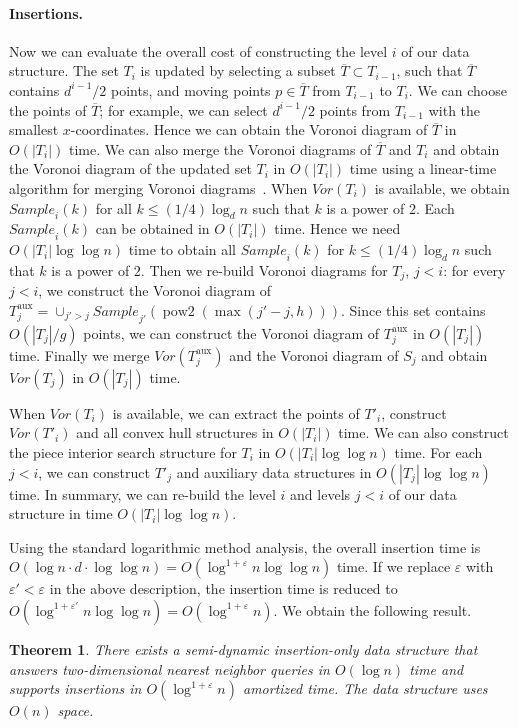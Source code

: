 \documentclass[12pt,a4paper,USenglish,cleveref, autoref, thm-restate]{article}
\newcommand{\Sample}{\mathit{Sample}}
\newcommand{\oT}{\overline{T}}
\newcommand{\Voron}{\mathit{Vor}}
\newcommand{\eps}{\varepsilon}
\newtheorem{theorem}{Theorem}
\newcommand{\Sample}{\mathit{Sample}}
\newcommand{\oT}{\overline{T}}
\newcommand{\Voron}{\mathit{Vor}}
\newcommand{\eps}{\varepsilon}
\newcommand{\Sample}{\mathit{Sample}}
\newcommand{\oT}{\overline{T}}
\newcommand{\Voron}{\mathit{Vor}}
\newcommand{\eps}{\varepsilon}
\begin{document}
\paragraph*{Insertions.}
Now we can evaluate the overall cost of constructing the level $i$ of our data structure. The set $T_i$ is updated by selecting a subset $\oT\subset T_{i-1}$, such that $\oT$ contains $d^{i-1}/2$ points, and moving  points  $p\in \oT$ from $T_{i-1}$ to $T_i$.  We can choose the points of $\oT$; for example, we can select $d^{i-1}/2$ points from $T_{i-1}$ with the smallest $x$-coordinates. Hence we can obtain the Voronoi diagram of $\oT$ in $O(|T_i|)$ time. We can also merge the Voronoi diagrams of $\oT$ and $T_i$ and obtain the Voronoi diagram of the updated set $T_i$ in $O(|T_i|)$ time using a linear-time  algorithm for merging Voronoi diagrams~\cite{Kirkpatrick79,Chazelle92}. When $\Voron(T_i)$ is available, we obtain $\Sample_i(k)$ for all $k\le (1/4)\log_d n$ such that $k$ is a power of $2$. Each $\Sample_i(k)$ can be obtained in $O(|T_i|)$ time. Hence we need $O(|T_i|\log\log n)$ time to obtain all $\Sample_i(k)$ for  $k\le (1/4)\log_d n$ such that $k$ is a power of $2$.  Then we re-build Voronoi diagrams for $T_j$, $j<i$: for every $j<i$, we construct the Voronoi diagram of $T^{\mathrm{aux}}_j=\cup_{j'>j} \Sample_{j'}(\operatorname{pow2}(\max(j'-j,h)))$. Since this set contains $O(|T_j|/g)$ points, we can construct the Voronoi diagram of $T^{\mathrm{aux}}_j$ in $O(|T_j|)$ time. Finally we merge  $\Voron(T^{\mathrm{aux}}_j)$  and the Voronoi diagram of $S_j$  and obtain $\Voron(T_j)$ in $O(|T_j|)$ time.

When $\Voron(T_i)$ is available, we can extract the points of $T'_i$, construct $\Voron(T'_i)$ and all convex hull structures in $O(|T_i|)$ time. We can also construct the piece interior search structure for $T_i$ in $O(|T_i|\log\log n)$ time. For each
$j<i$, we can construct $T'_j$ and auxiliary data structures in $O(|T_j|\log \log n)$ time. In summary, we can re-build the level $i$ and levels $j<i$ of our data structure in time $O(|T_i|\log\log n)$.


Using the standard logarithmic method analysis, the overall insertion time is $O(\log n\cdot d \cdot \log\log n)=O(\log^{1+\eps}n\log\log n)$ time. If we replace $\eps$ with $\eps'<\eps$ in the above description,  the insertion time is reduced to $O(\log^{1+\eps'}n\log\log n)=O(\log^{1+\eps}n)$. We obtain the following result.
\begin{theorem}
  \label{theor:semidyn2}
  There exists a semi-dynamic insertion-only  data structure that answers two-dimensional nearest neighbor queries in $O(\log n)$ time and supports insertions  in $O(\log^{1+\eps} n)$ amortized time.  The data structure uses $O(n)$ space. 
\end{theorem}
\end{document}
